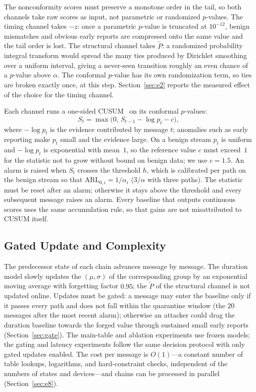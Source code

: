 \documentclass[manuscript,screen,review]{acmart}
\begin{document}
The nonconformity scores must preserve a monotone order in the tail, so both channels take raw scores as input, not parametric or randomized $p$-values. The timing channel takes $-z$: once a parametric $p$-value is truncated at $10^{-12}$, benign mismatches and obvious early reports are compressed onto the same value and the tail order is lost. The structural channel takes $\tilde P$: a randomized probability integral transform would spread the many ties produced by {Dirichlet} smoothing over a uniform interval, giving a never-seen transition roughly an even chance of a $p$-value above $\alpha$. The conformal $p$-value has its own randomization term, so ties are broken exactly once, at this step. Section~\ref{sec:e2} reports the measured effect of the choice for the timing channel.

Each channel runs a one-sided {CUSUM}~\cite{li2015quickest} on its conformal $p$-values:
\begin{equation}
  S_t=\max\bigl(0,\,S_{t-1}-\log p_t-c\bigr),
  \label{eq:cusum}
\end{equation}
where $-\log p_t$ is the evidence contributed by message $t$; anomalies such as early reporting make $p_t$ small and the evidence large. On a benign stream $p_t$ is uniform and $-\log p_t$ is exponential with mean~$1$, so the reference value $c$ must exceed~$1$ for the statistic not to grow without bound on benign data; we use $c=1.5$. An alarm is raised when $S_t$ crosses the threshold $h$, which is calibrated per path on the benign stream so that $\mathrm{ARL}_{0,i}=1/\alpha_i$ ($3/\alpha$ with three paths). The statistic must be reset after an alarm; otherwise it stays above the threshold and every subsequent message raises an alarm. Every baseline that outputs continuous scores uses the same accumulation rule, so that gains are not misattributed to {CUSUM} itself.

\subsection{Gated Update and Complexity}
\label{sec:online}

The predecessor state of each chain advances message by message. The duration model slowly updates the $(\mu,\sigma)$ of the corresponding group by an exponential moving average with forgetting factor $0.95$; the $\tilde P$ of the structural channel is not updated online. Updates must be gated: a message may enter the baseline only if it passes every path and does not fall within the quarantine window (the $20$ messages after the most recent alarm); otherwise an attacker could drag the duration baseline towards the forged value through sustained small early reports (Section~\ref{sec:gate}). The main-table and ablation experiments use frozen models; the gating and latency experiments follow the same decision protocol with only gated updates enabled. The cost per message is $O(1)$---a constant number of table lookups, logarithms, and hard-constraint checks, independent of the numbers of states and devices---and chains can be processed in parallel (Section~\ref{sec:e8}).
\end{document}
